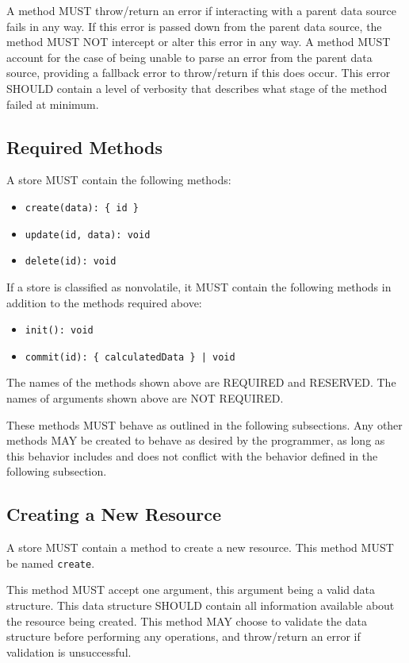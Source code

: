 \documentclass{article}
\begin{document}
A method MUST throw/return an error if interacting with a parent data source fails in any way. If this error is passed down from the parent data source, the method MUST NOT intercept or alter this error in any way. A method MUST account for the case of being unable to parse an error from the parent data source, providing a fallback error to throw/return if this does occur. This error SHOULD contain a level of verbosity that describes what stage of the method failed at minimum.

\subsection{Required Methods}
A store MUST contain the following methods:
\begin{itemize}
    \item \verb|create(data): { id }|
    \item \verb|update(id, data): void|
    \item \verb|delete(id): void|
\end{itemize}
\newpage
If a store is classified as nonvolatile, it MUST contain the following methods in addition to the methods required above:
\begin{itemize}
    \item \verb|init(): void|
    \item \begin{verbatim}commit(id): { calculatedData } | void\end{verbatim}
\end{itemize}

The names of the methods shown above are REQUIRED and RESERVED. The names of arguments shown above are NOT REQUIRED.

These methods MUST behave as outlined in the following subsections. Any other methods MAY be created to behave as desired by the programmer, as long as this behavior includes and does not conflict with the behavior defined in the following subsection.

\subsection{Creating a New Resource}
A store MUST contain a method to create a new resource. This method MUST be named \verb|create|.

This method MUST accept one argument, this argument being a valid data structure. This data structure SHOULD contain all information available about the resource being created. This method MAY choose to validate the data structure before performing any operations, and throw/return an error if validation is unsuccessful.
\end{document}
